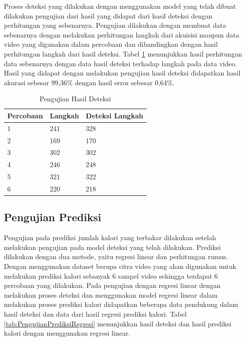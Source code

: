 Proses deteksi yang dilakukan dengan menggunakan model yang telah dibuat dilakukan pengujian dari hasil yang didapat dari hasil deteksi dengan perhitungan yang sebenarnya. Pengujian dilakukan dengan membuat data sebenarnya dengan melakukan perhitungan langkah dari akuisisi maupun data video yang digunakan dalam percobaan dan dibandingkan dengan hasil perhitungan langkah dari hasil deteksi. Tabel \ref{tab:PengujianDeteksi} menunjukkan hasil perhitungan data sebenarnya dengan data hasil deteksi terhadap langkah pada data video. Hasil yang didapat dengan melakukan pengujian hasil deteksi didapatkan hasil akurasi sebesar 99,36\% dengan hasil error sebesar 0,64\%.

\begin{table}
  \caption{Pengujian Hasil Deteksi}
  \label{tab:PengujianDeteksi}
  \centering
  \begin{tabular}{lll}
    \toprule
    Percobaan & Langkah & Deteksi Langkah  \\
    \midrule
    1   & 241   & 328    \\
    2   & 169   & 170    \\
    3   & 302   & 302    \\
    4   & 246   & 248    \\
    5   & 321   & 322    \\
    6   & 220   & 218    \\
    \bottomrule
  \end{tabular}
\end{table}


\subsection{Pengujian Prediksi}
\label{subsec:PengujianPrediksi}

Pengujian pada prediksi jumlah kalori yang terbakar dilakukan setelah melakukan pengujian pada model deteksi yang telah dilakukan. Prediksi dilakukan dengan dua metode, yaitu regresi linear dan perhitungan rumus. Dengan menggunakan dataset berupa citra video yang akan digunakan untuk melakukan prediksi kalori sebanyak 6 sampel video sehingga terdapat 6 percobaan yang dilakukan. Pada pengujian dengan regresi linear dengan melakukan proses deteksi dan menggunakan model regresi linear dalam melakukan proses prediksi kalori didapatkan beberapa data pendukung dalam hasil deteksi dan data dari hasil regresi prediksi kalori. Tabel \ref{tab:PengujianPrediksiRegresi} menunjukkan hasil deteksi dan hasil prediksi kalori dengan menggunakan regresi linear.


